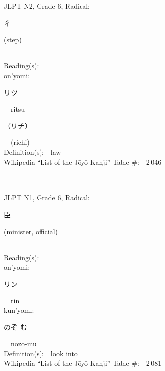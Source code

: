 \begin{multicols}{2}
{JLPT N2, Grade 6, Radical:\ \ {\begin{CJK}{UTF8}{min} 彳 \end{CJK}} (step) } \\
Reading(s):\ \ \\
{\hspace*{1em}}on'yomi:\ \ \\
{\hspace*{2em}}{\begin{CJK}{UTF8}{min} リツ \end{CJK}}\ \ ritsu\ \ \\
{\hspace*{2em}}{\begin{CJK}{UTF8}{min} （リチ） \end{CJK}}\ \ (richi)\ \ \\
Definition(s):\ \ law \\
Wikipedia ``List of the J\=oy\=o Kanji'' Table \#:\ \ 2\,046 \\
\ \ \\
{\fontsize{34pt}{40pt}  }\ \ \\  %
{JLPT N1, Grade 6, Radical:\ \ {\begin{CJK}{UTF8}{min} 臣 \end{CJK}} (minister, official) } \\
Reading(s):\ \ \\
{\hspace*{1em}}on'yomi:\ \ \\
{\hspace*{2em}}{\begin{CJK}{UTF8}{min} リン \end{CJK}}\ \ rin\ \ \\
{\hspace*{1em}}kun'yomi:\ \ \\
{\hspace*{2em}}{\begin{CJK}{UTF8}{min} のぞ-む \end{CJK}}\ \ nozo-mu\ \ \\
Definition(s):\ \ look into \\
Wikipedia ``List of the J\=oy\=o Kanji'' Table \#:\ \ 2\,081 \\
\ \ \\
{\fontsize{34pt}{40pt}  }\ \ \\  %

\end{multicols}
